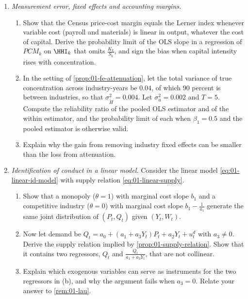 \begin{enumerate}[label=\arabic*., leftmargin=*, itemsep=6pt]
\item \textit{Measurement error, fixed effects and accounting margins.}
\begin{enumerate}[label=(\alph*)]
  \item Show that the Census price-cost margin equals the Lerner index whenever variable cost (payroll and
  materials) is linear in output, whatever the cost of capital. Derive the probability limit of the OLS slope in a
  regression of $\mathit{PCM}_k$ on $\HHI_k$ that omits $\frac{K_k}{S_k}$, and sign the bias when capital intensity
  rises with concentration.
  \item In the setting of \cref{prop:01-fe-attenuation}, let the total variance of true concentration across
  industry-years be $0.04$, of which 90 percent is between industries, so that $\sigma^2_{\tilde H} = 0.004$. Let
  $\sigma_u^2 = 0.002$ and $T = 5$. Compute the reliability ratio of the pooled OLS estimator and of the within
  estimator, and the probability limit of each when $\beta_1 = 0.5$ and the pooled estimator is otherwise valid.
  \item Explain why the gain from removing industry fixed effects can be smaller than the loss from attenuation.
\end{enumerate}

\item \textit{Identification of conduct in a linear model.} Consider the linear model \eqref{eq:01-linear-id-model}
with supply relation \eqref{eq:01-linear-supply}.
\begin{enumerate}[label=(\alph*)]
  \item Show that a monopoly ($\theta = 1$) with marginal cost slope $b_1$ and a competitive industry ($\theta = 0$)
  with marginal cost slope $b_1 - \frac{1}{a_1}$ generate the same joint distribution of $(P_t, Q_t)$ given
  $(Y_t, W_t)$.
  \item Now let demand be $Q_t = a_0 + (a_1 + a_3 Y_t) P_t + a_2 Y_t + u^d_t$ with $a_3 \ne 0$. Derive the supply
  relation implied by \cref{prop:01-supply-relation}. Show that it contains two regressors, $Q_t$ and
  $\frac{Q_t}{a_1 + a_3 Y_t}$, that are not collinear.
  \item Explain which exogenous variables can serve as instruments for the two regressors in (b), and why the
  argument fails when $a_3 = 0$. Relate your answer to \cref{rem:01-lau}.
\end{enumerate}


\end{enumerate}
